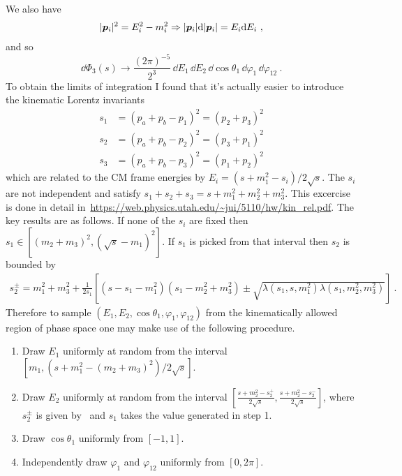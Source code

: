 We also have 
\begin{align}
    |\pvec[i]|^2 = E_i^2 - m_i^2  \Rightarrow  |\pvec[i]| \dd |\pvec[i]| =  E_i \dd E_i \ , 
\end{align}
and so
\begin{equation}
    \dd \Phi_3 (s) \rightarrow 
    \frac{(2\pi)^{-5}}{2^3} 
    \, \dd E_1 \, \dd E_2 
    \, \dd \cos \theta_1 \, \dd \varphi_1 
    \, \dd \varphi_{12} \ .
\end{equation}
To obtain the limits of integration I found that it's actually easier to introduce the kinematic Lorentz invariants
\begin{align}
    s_1 &= (p_a + p_b - p_1)^2 = (p_2 + p_3)^2 \\
    s_2 &= (p_a + p_b - p_2)^2 = (p_3 + p_1)^2 \\
    s_3 &= (p_a + p_b - p_3)^2 = (p_1 + p_2)^2
\end{align}
which are related to the CM frame energies by $E_i = (s + m_1^2 - s_i)/2 \sqrt{s}$. 
The $s_i$ are not independent and satisfy $s_1 + s_2 + s_3 = s + m_1^2 + m_2^2 + m_3^2$. 
This excercise is done in detail in~\url{https://web.physics.utah.edu/~jui/5110/hw/kin_rel.pdf}. 
The key results are as follows. 
If none of the $s_i$ are fixed then $s_1 \in [(m_2 + m_3)^2, (\sqrt{s} - m_1)^2]$.
If $s_1$ is picked from that interval then $s_2$ is bounded by 
\begin{align}
    \label{eq:s2-bounds}
    s_2^{\pm} = m_1^2 + m_3^2 + \frac{1}{2 s_1} 
    \left[
        (s - s_1 - m_1^2)(s_1 - m_2^2 + m_3^2) \pm \sqrt{\lambda(s_1, s, m_1^2) \lambda(s_1, m_2^2, m_3^2) }
    \right] \ .
\end{align}
Therefore to sample $(E_1, E_2, \cos \theta_1, \varphi_1, \varphi_{12})$ from the kinematically allowed region of phase space one may make use of the following procedure.
\begin{enumerate}
    \item Draw $E_1$ uniformly at random from the interval $[m_1, (s + m_1^2 - (m_2 + m_3)^2) / 2 \sqrt{s}]$. 
    \item Draw $E_2$ uniformly at random from the interval $[\frac{s + m_2^2 - s_2^{+}}{2 \sqrt{s}}, \frac{s + m_2^2 - s_2^{-}}{2 \sqrt{s}}]$, where $s_2^{\pm}$ is given by~ and $s_1$ takes the value generated in step 1.
    \item Draw $\cos \theta_1$ uniformly from $[-1, 1]$.
    \item Independently draw $\varphi_1$ and $\varphi_{12}$ uniformly from $[0, 2\pi]$. 
\end{enumerate}

